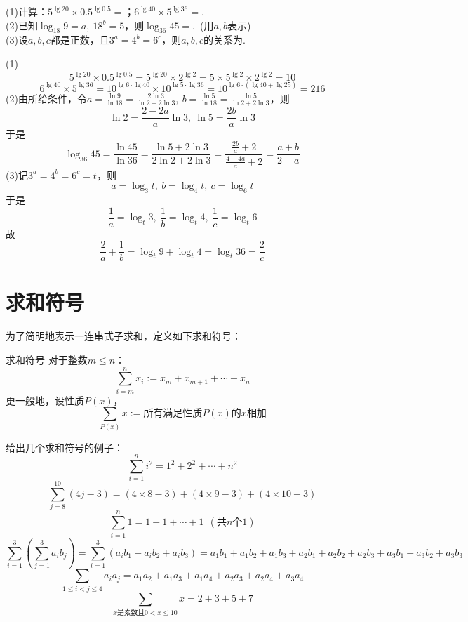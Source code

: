 \documentclass[lang=cn, zihao=5]{elegantbook}
\newcommand{\ssb}[1]{\left( #1 \right)}
\newcommand{\tk}{\uline{\hspace{4em}}}
\begin{document}
\begin{example}
	(1)计算：$5^{\lg 20} \times 0.5^{\lg 0.5}=$\tk ；$6^{\lg 40} \times 5^{\lg 36}=$\tk . \\
	(2)已知$\log_{18}{9}=a,~18^b=5$，则$\log_{36}{45}=$\tk .~(用$a,b$表示) \\
	(3)设$a,b,c$都是正数，且$3^a=4^b=6^c$，则$a,b,c$的关系为\tk .
\end{example}
\begin{solution}
	(1)$$5^{\lg 20} \times 0.5^{\lg 0.5} = 5^{\lg 20} \times 2^{\lg 2} = 5 \times 5^{\lg 2} \times 2^{\lg 2} = 10$$
	$$6^{\lg 40} \times 5^{\lg 36} = 10^{\lg 6 \cdot \lg 40} \times 10^{\lg 5 \cdot \lg 36} = 10^{\lg 6 \cdot (\lg 40 + \lg 25)} = 216$$
	(2)由所给条件，令$a=\frac{\ln{9}}{\ln{18}}=\frac{2\ln{3}}{\ln{2}+2\ln{3}} ,~b=\frac{\ln{5}}{\ln{18}}=\frac{\ln{5}}{\ln{2}+2\ln{3}}$，则$$\ln{2}=\frac{2-2a}{a}\ln{3},~\ln{5}=\frac{2b}{a}\ln{3}$$
	于是
	$$\log_{36}{45} = \frac{\ln{45}}{\ln{36}} = \frac{\ln{5} + 2\ln{3}}{2\ln{2}+2\ln{3}} = \frac{\frac{2b}{a}+2}{\frac{4-4a}{a}+2} = \frac{a+b}{2-a}$$
	(3)记$3^a=4^b=6^c=t$，则$$a=\log_{3}{t},~b=\log_{4}{t},~c=\log_{6}{t}$$
	于是$$\frac{1}{a}=\log_{t}{3},~\frac{1}{b}=\log_{t}{4},~\frac{1}{c}=\log_{t}{6}$$
	故$$\frac{2}{a} + \frac{1}{b} = \log_{t}{9} + \log_{t}{4} = \log_{t}{36} = \frac{2}{c}$$
\end{solution}

\section{求和符号}

为了简明地表示一连串式子求和，定义如下求和符号：

\begin{definition}{求和符号}
	对于整数$m \leq n$：$$\sum_{i=m}^{n} x_i := x_m + x_{m+1} + \cdots + x_{n}$$
	更一般地，设性质$P(x)$，$$\sum_{P(x)} x := \textit{所有满足性质$P(x)$的$x$相加}$$
\end{definition}

给出几个求和符号的例子：
$$\sum_{i=1}^{n} i^2 = 1^2 + 2^2 + \cdots + n^2$$
$$\sum_{j=8}^{10} (4j-3) = (4 \times 8-3) + (4 \times 9 - 3) + (4 \times 10 -3)$$
$$\sum_{i=1}^{n} 1 = 1 + 1 + \cdots + 1~~(\textit{共$n$个$1$})$$
$$\sum_{i=1}^{3} \ssb{\sum_{j=1}^{3} a_ib_j} = \sum_{i=1}^{3} \ssb{a_ib_1+a_ib_2+a_ib_3} = a_1b_1+a_1b_2+a_1b_3+a_2b_1+a_2b_2+a_2b_3+a_3b_1+a_3b_2+a_3b_3$$
$$\sum_{1 \leq i < j \leq 4} a_ia_j = a_1a_2 + a_1a_3 + a_1a_4 + a_2a_3 + a_2a_4 + a_3a_4$$
$$\sum_{\textit{$x$是素数且$0< x \leq 10$}} x = 2+3+5+7$$
\end{document}
